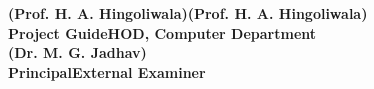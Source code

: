 \begin{spacing}{0}
\vspace{3.0cm}
\large{\textbf{(Prof. H. A. Hingoliwala)}}\hspace*{1.9in}\large{\textbf{(Prof. H. A. Hingoliwala)}}\\
\hspace*{0.7in}\textbf{Project Guide}\hspace*{2.2in}\textbf{HOD, Computer Department}\\[3cm]
\hspace*{0.5in}\large{\textbf{(Dr. M. G. Jadhav)}}\\
\hspace*{0.9in}\textbf{Principal}\hspace*{2.8in}\textbf{External Examiner}\\[0.5cm]
\end{spacing}
\newpage